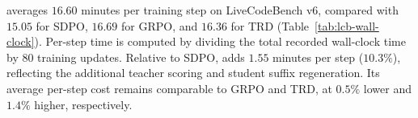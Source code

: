 \method{} averages $16.60$ minutes per training step on LiveCodeBench v6, compared with $15.05$ for SDPO, $16.69$ for GRPO, and $16.36$ for TRD (Table~\ref{tab:lcb-wall-clock}). Per-step time is computed by dividing the total recorded wall-clock time by 80 training updates. Relative to SDPO, \method{} adds $1.55$ minutes per step ($10.3\%$), reflecting the additional teacher scoring and student suffix regeneration. Its average per-step cost remains comparable to GRPO and TRD, at $0.5\%$ lower and $1.4\%$ higher, respectively.























































































































